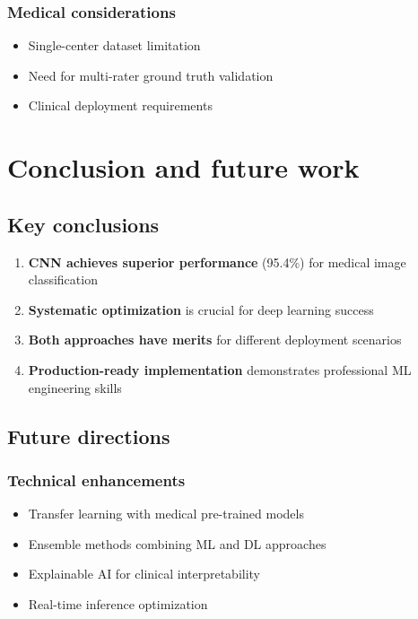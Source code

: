 \documentclass[11pt]{article}
\begin{document}
\subsubsection{Medical considerations}
\begin{itemize}
    \item Single-center dataset limitation
    \item Need for multi-rater ground truth validation
    \item Clinical deployment requirements
\end{itemize}

\section{Conclusion and future work}

\subsection{Key conclusions}
\begin{enumerate}
    \item \textbf{CNN achieves superior performance} (95.4\%) for medical image classification
    \item \textbf{Systematic optimization} is crucial for deep learning success
    \item \textbf{Both approaches have merits} for different deployment scenarios
    \item \textbf{Production-ready implementation} demonstrates professional ML engineering skills
\end{enumerate}

\subsection{Future directions}

\subsubsection{Technical enhancements}
\begin{itemize}
    \item Transfer learning with medical pre-trained models
    \item Ensemble methods combining ML and DL approaches
    \item Explainable AI for clinical interpretability
    \item Real-time inference optimization
\end{itemize}
\end{document}
